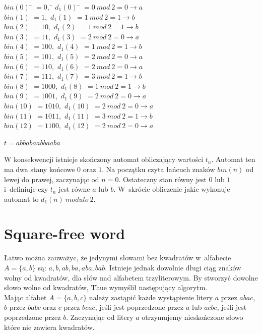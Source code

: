 \documentclass[document]{xmgr}
\begin{document}
\begin{tabbing}
$bin(0)$\hspace{1em} \= $= 0,$\hspace{7em} \= $d_1 (0)$\hspace{1em} \= $= 0\ mod\ 2 = 0 \to a$ \\
$bin(1)$ \> $= 1,$ \> $d_1 (1)$ \> $= 1\ mod\ 2 = 1 \to b$\\
$bin(2)$ \> $= 10,$ \> $d_1 (2)$ \> $= 1\ mod\ 2 = 1 \to b$\\
$bin(3)$ \> $= 11,$ \> $d_1 (3)$ \> $= 2\ mod\ 2 = 0 \to a$\\
$bin(4)$ \> $= 100,$ \> $d_1 (4)$ \> $= 1\ mod\ 2 = 1 \to b$\\
$bin(5)$ \> $= 101,$ \> $d_1 (5)$ \> $= 2\ mod\ 2 = 0 \to a$\\
$bin(6)$ \> $= 110,$ \> $d_1 (6)$ \> $= 2\ mod\ 2 = 0 \to a$\\
$bin(7)$ \> $= 111,$ \> $d_1 (7)$ \> $= 3\ mod\ 2 = 1 \to b$\\
$bin(8)$ \> $= 1000,$ \> $d_1 (8)$ \> $= 1\ mod\ 2 = 1 \to b$\\
$bin(9)$ \> $= 1001,$ \> $d_1 (9)$ \> $= 2\ mod\ 2 = 0 \to a$\\
$bin(10)$ \> $= 1010,$	\> $d_1 (10)$ \> $= 2\ mod\ 2 = 0 \to a$\\
$bin(11)$ \> $= 1011,$ 	\> $d_1 (11)$ \> $= 3\ mod\ 2 = 1 \to b$\\
$bin(12)$ \> $= 1100,$ 	\> $d_1 (12)$ \> $= 2\ mod\ 2 = 0 \to a$
\end{tabbing}

{\centering $t = abbabaabbaaba$ \par}

W konsekwencji istnieje skończony automat obliczający wartości $t_n$. Automat ten ma dwa stany końcowe $0$ oraz $1$. Na początku czyta łańcuch znaków $bin(n)$ od lewej do prawej, zaczynając od $n=0$. Ostateczny stan równy jest $0$ lub $1$ i~definiuje czy $t_n$ jest równe $a$ lub $b$. W~skrócie obliczenie jakie wykonuje automat to $d_1(n)\ modulo\ 2$.


\section{Square-free word}
Łatwo można zauważyc, że jedynymi słowami bez kwadratów w~alfabecie $A = \{a, b\}$ są: $a, b, ab, ba, aba, bab$. Istnieje jednak dowolnie długi ciąg znaków wolny od kwadratów, dla słów nad alfabetem trzyliterowym. By stworzyć dowolne słowo wolne od kwadratów, Thue wymyślił następujący algorytm.\\
Mając alfabet $A = \{a, b, c\}$ należy zastąpić każde wystąpienie litery $a$ przez $abac$,  $b$ przez $babc$ oraz $c$ przez $bcac$, jeśli jest poprzedzone przez $a$ lub $acbc$, jeśli jest poprzedzone przez $b$. Zaczynając od litery $a$ otrzymujemy nieskończone słowo które nie zawiera kwadratów.
\end{document}

